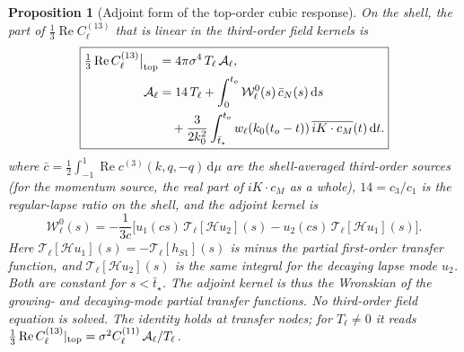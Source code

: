 \documentclass[11pt]{article}
\newtheorem{proposition}[theorem]{Proposition}
\theoremstyle{definition}
\theoremstyle{remark}
\newcommand{\dd}{\mathrm{d}}
\begin{document}
\begin{proposition}[Adjoint form of the top-order cubic response]\label{prop:adjoint}
On the shell, the part of $\frac13\operatorname{Re}C^{(13)}_\ell$ that is linear in the
third-order field kernels is
\[
\boxed{\begin{aligned}
\tfrac13\operatorname{Re}C^{(13)}_\ell\big|_{\rm top}
&=4\pi\sigma^4\,T_\ell\,\mathcal A_\ell,\\
\mathcal A_\ell&=14\,T_\ell+\int_0^{t_o}\mathcal W^0_\ell(s)\,\bar c_N(s)\,\dd s\\
&\quad+\frac{3}{2k_0^2}\int_{\bar t_\star}^{t_o}w_\ell(k_0(t_o-t))\,\overline{iK\cdot c_M}(t)\,\dd t.
\end{aligned}}
\]
where $\bar c=\frac12\int_{-1}^1\operatorname{Re}c^{(3)}(k,q,-q)\,\dd\mu$ are the
shell-averaged third-order sources (for the momentum source, the real part of
$iK\cdot c_M$ as a whole), $14=c_3/c_1$ is the regular-lapse ratio on the shell, and the
adjoint kernel is
\[
\mathcal W^0_\ell(s)=-\frac1{3c}\Big[u_1(cs)\,\mathcal T_\ell[\mathcal H u_2](s)
-u_2(cs)\,\mathcal T_\ell[\mathcal H u_1](s)\Big].
\]
Here $\mathcal T_\ell[\mathcal Hu_1](s)=-\mathcal T_\ell[h_{S1}](s)$ is minus the partial
first-order transfer function, and $\mathcal T_\ell[\mathcal Hu_2](s)$ is the same integral for
the decaying lapse mode $u_2$. Both are constant for $s<\bar t_\star$. The adjoint kernel is
thus the Wronskian of the growing- and decaying-mode partial transfer functions. No
third-order field equation is solved. The identity holds at transfer nodes; for
$T_\ell\neq0$ it reads $\frac13\operatorname{Re}C^{(13)}_\ell|_{\rm top}=\sigma^2C^{(11)}_\ell\,\mathcal A_\ell/T_\ell$.
\end{proposition}
\end{document}
